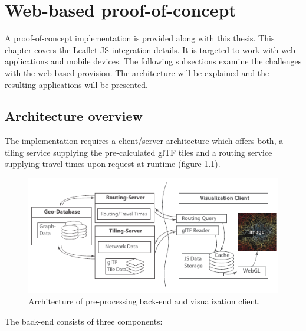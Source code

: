 
\cleardoublepage              %
\chapter{Web-based proof-of-concept}
  \label{chap:imple}
  A proof-of-concept implementation is provided along with this thesis. This
  chapter covers the Leaflet-JS integration details. It is targeted to work with
  web applications and mobile devices. The following subsections examine the
  challenges with the web-based provision. The architecture will be
  explained and the resulting applications will be presented.\par

  \section{Architecture overview}
    \label{sec:imple:archi}
    The implementation requires a client/server architecture which offers both,
    a tiling service supplying the pre-calculated glTF tiles and a routing
    service supplying travel times upon request at runtime (figure
    \ref{fig:imple:archi}).\par

    \begin{figure}[htb]
      \centering
      \includegraphics[width=\linewidth]{./img/conceptual-overview-bw.pdf}
      \caption{Architecture of pre-processing back-end and visualization client.}
      \label{fig:imple:archi}
    \end{figure}

    The back-end consists of three components:\par

